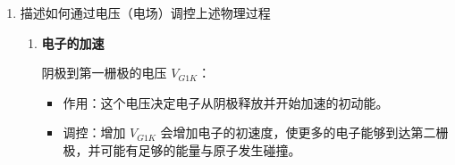 \documentclass[dvipsnames, svgnames,a4paper,11pt]{article}
\begin{document}
\begin{enumerate}
\begin{enumerate}
			电子从阴极发射并在电场中加速，其动能的变化可以使用经典力学公式来描述。如果电子从阴极 \( K \) 到第一栅极 \( G1 \) 间的加速电压是 \( V_{G1K} \)，电子的加速过程可以表示为：
			\[ KE = eV_{G1K} \]
			其中，\( KE \) 是电子的动能，\( e \) 是电子的电荷，\( V_{G1K} \) 是加速电压。电子的速度 \( v \) 可以通过动能公式计算得出：
			\[ v = \sqrt{\frac{2KE}{m}} = \sqrt{\frac{2eV_{G1K}}{m}} \]
			这里 \( m \) 是电子的质量。
			
			\item \textbf{弹性碰撞}
			
			在弹性碰撞中，电子与原子核碰撞后能量守恒且动量守恒。如果碰撞是一维的，并假设原子核质量远大于电子质量，则电子的速度方向将反转，但其速度大小保持不变。对于更一般的三维碰撞，电子散射角 \( \theta \) 将影响其在原来运动方向上的速度分量：
			\[ v' = v \cos(\theta) \]
			这里 \( v' \) 是碰撞后沿原运动方向的电子速度。
			
			\item \textbf{非弹性碰撞}
			
			在非弹性碰撞中，电子传递给原子的能量足以使其从基态跃迁到激发态。假设激发能为 \( \Delta E \)，电子失去的能量等于激发能：
			\[ \Delta KE = \Delta E = h\nu \]
			这里 \( \nu \) 是由激发态到基态跃迁时原子发出光子的频率，\( h \) 是普朗克常数。电子碰撞后的剩余能量将决定其是否能够继续向板极运动。
			
			\item \textbf{多粒子系统的统计}
			
			在多粒子系统中，电子的速度、能量和位置分布可以通过统计力学来描述。电子的速度分布通常可以假设为麦克斯韦-玻尔兹曼分布：
			\[ f(v) = 4\pi \left(\frac{m}{2\pi kT}\right)^{3/2} v^2 e^{-\frac{mv^2}{2kT}} \]
			其中，\( k \) 是玻尔兹曼常数，\( T \) 是电子的温度。这个分布描述了在热平衡状态下，电子速度的概率密度。
		\end{enumerate}
		
		\item 描述如何通过电压（电场）调控上述物理过程
		\begin{enumerate}
			\item \textbf{电子的加速}
			
			阴极到第一栅极的电压 \( V_{G1K} \)：
			\begin{itemize}
				\item 作用：这个电压决定电子从阴极释放并开始加速的初动能。
				\item 调控：增加 \( V_{G1K} \) 会增加电子的初速度，使更多的电子能够到达第二栅极，并可能有足够的能量与原子发生碰撞。
			\end{itemize}
			

\end{enumerate}
\end{enumerate}
\end{document}
